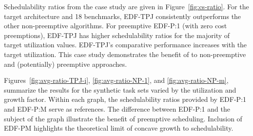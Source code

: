 Schedulability ratios from the \bundlep{} case study are given in
Figure~\ref{fig:cs-ratio}. For the target architecture and 18 benchmarks, EDF-TPJ consistently outperforms the other non-preemptive
algorithms. For preemptive EDF-P:1 (with zero cost preemptions), EDF-TPJ
has higher schedulability ratios for the majority of target
utilization values. EDF-TPJ's comparative performance increases
with the target utilization. This case study demonstrates the benefit
of \tpj{} to non-preemptive and (potentially) preemptive approaches.
 
Figures~\ref{fig:avg-ratio-TPJ-i}, \ref{fig:avg-ratio-NP-1}, and \ref{fig:avg-ratio-NP-m}, summarize the results for the synthetic
task sets varied by the utilization and growth factor. Within
each graph, the schedulability ratios provided by EDF-P:1 and EDF-P:M serve as
references. The difference between EDF-P:1 and the subject of the
graph illustrate the benefit of preemptive scheduling. Inclusion of
EDF-PM highlights the theoretical limit of concave growth to
schedulability.

